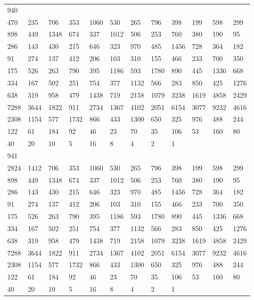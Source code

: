 \begin{longtable}{llllllllllll}
940&&&&&&&&&&&\\
470& 235& 706& 353& 1060& 530& 265& 796& 398& 199& 598& 299\\
898& 449& 1348& 674& 337& 1012& 506& 253& 760& 380& 190& 95\\
286& 143& 430& 215& 646& 323& 970& 485& 1456& 728& 364& 182\\
91& 274& 137& 412& 206& 103& 310& 155& 466& 233& 700& 350\\
175& 526& 263& 790& 395& 1186& 593& 1780& 890& 445& 1336& 668\\
334& 167& 502& 251& 754& 377& 1132& 566& 283& 850& 425& 1276\\
638& 319& 958& 479& 1438& 719& 2158& 1079& 3238& 1619& 4858& 2429\\
7288& 3644& 1822& 911& 2734& 1367& 4102& 2051& 6154& 3077& 9232& 4616\\
2308& 1154& 577& 1732& 866& 433& 1300& 650& 325& 976& 488& 244\\
122& 61& 184& 92& 46& 23& 70& 35& 106& 53& 160& 80\\
40& 20& 10& 5& 16& 8& 4& 2& 1& \\

941&&&&&&&&&&&\\
2824& 1412& 706& 353& 1060& 530& 265& 796& 398& 199& 598& 299\\
898& 449& 1348& 674& 337& 1012& 506& 253& 760& 380& 190& 95\\
286& 143& 430& 215& 646& 323& 970& 485& 1456& 728& 364& 182\\
91& 274& 137& 412& 206& 103& 310& 155& 466& 233& 700& 350\\
175& 526& 263& 790& 395& 1186& 593& 1780& 890& 445& 1336& 668\\
334& 167& 502& 251& 754& 377& 1132& 566& 283& 850& 425& 1276\\
638& 319& 958& 479& 1438& 719& 2158& 1079& 3238& 1619& 4858& 2429\\
7288& 3644& 1822& 911& 2734& 1367& 4102& 2051& 6154& 3077& 9232& 4616\\
2308& 1154& 577& 1732& 866& 433& 1300& 650& 325& 976& 488& 244\\
122& 61& 184& 92& 46& 23& 70& 35& 106& 53& 160& 80\\
40& 20& 10& 5& 16& 8& 4& 2& 1& \\


\end{longtable}
